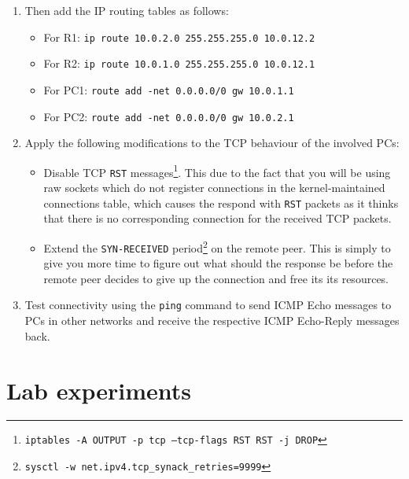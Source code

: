 \documentclass[pdftex,12pt,a4paper]{article}
\begin{document}
\begin{enumerate}
            \item Then add the IP routing tables as follows:
                \begin{itemize}
                    \item For R1: \texttt{ip route 10.0.2.0 255.255.255.0
                        10.0.12.2}
                    \item For R2: \texttt{ip route 10.0.1.0 255.255.255.0
                        10.0.12.1}
                    \item For PC1: \texttt{route add -net 0.0.0.0/0 gw
                        10.0.1.1}
                    \item For PC2: \texttt{route add -net 0.0.0.0/0 gw
                                10.0.2.1}
                \end{itemize}
            \item Apply the following modifications to the TCP behaviour of the
                involved PCs:
                \begin{itemize}
                    \item Disable TCP \texttt{RST}
                        messages\footnote{\texttt{iptables -A OUTPUT -p tcp
                        --tcp-flags RST RST -j DROP}}. This due to the fact
                        that you will be using raw sockets which do not
                        register connections in the kernel-maintained
                        connections table, which causes the respond with
                        \texttt{RST} packets as it thinks that there is no
                        corresponding connection for the received TCP packets.
                    \item Extend the \texttt{SYN-RECEIVED}
                        period\footnote{\texttt{sysctl -w
                        net.ipv4.tcp\_synack\_retries=9999}} on the remote
                        peer. This is simply to give you more time to figure
                        out what should the response be before the remote peer
                        decides to give up the connection and free its its
                        resources.
                \end{itemize}
            \item Test connectivity using the \texttt{ping} command to send
                ICMP Echo messages to PCs in other networks and receive the
                respective ICMP Echo-Reply messages back.
        \end{enumerate}

    \section{Lab experiments}
\end{document}
